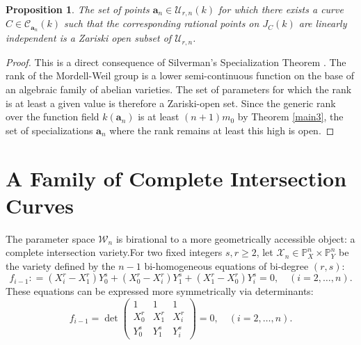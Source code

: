 \documentclass[11pt, a4paper]{amsart}
\newtheorem{prop}[thm]{Proposition}
\theoremstyle{definition}
\newcommand{\Pp}{\mathbb{P}}
\newcommand{\Cc}{\mathcal{C}}
\newcommand{\Uc}{\mathcal{U}}
\newcommand{\Wc}{\mathcal{W}}
\newcommand{\Xc}{\mathcal{X}}
\newcommand{\ba}{\mathbf{a}}
\begin{document}
\begin{prop}
	\label{linear-independence-open}
	The set of points $\ba_n \in \Uc_{r,n}(k)$ for which there exists a curve $C \in \Cc_{\ba_n}(k)$ such that the corresponding rational points on $J_C(k)$ are linearly independent is a Zariski open subset of $\Uc_{r,n}$.
\end{prop}
\begin{proof}
	This is a direct consequence of Silverman's Specialization Theorem \cite{Silverman1983}. The rank of the Mordell-Weil group is a lower semi-continuous function on the base of an algebraic family of abelian varieties. The set of parameters for which the rank is at least a given value is therefore a Zariski-open set. Since the generic rank over the function field $k(\ba_n)$ is at least $(n+1)m_0$ by Theorem \ref{main3}, the set of specializations $\ba_n$ where the rank remains at least this high is open.
\end{proof}

\section{A Family of Complete Intersection Curves}
\label{curves}

The parameter space $\Wc_n$ is birational to a more geometrically accessible object: a complete intersection variety.For two fixed  integers $ s, r \geq 2$, let $\Xc_n\in  \Pp^n_X \times \Pp^n_Y$  be the variety  defined by the $n-1$ bi-homogeneous equations of bi-degree $(r,s)$:
\begin{equation} \label{eq3}
	f_{i-1}: = (X_i^r - X_1^r)Y_0^s + (X_0^r - X_i^r)Y_1^s + (X_1^r - X_0^r)Y_i^s = 0, \quad (i=2, \dots, n).
\end{equation}
These equations can be expressed more symmetrically via determinants:
\begin{equation} \label{eq3b}
	f_{i-1} = \det \begin{pmatrix} 1 & 1 & 1 \\ X_0^r & X_1^r & X_i^r \\ Y_0^s & Y_1^s & Y_i^s \end{pmatrix} = 0, \quad (i=2, \dots, n).
\end{equation}
\end{document}
